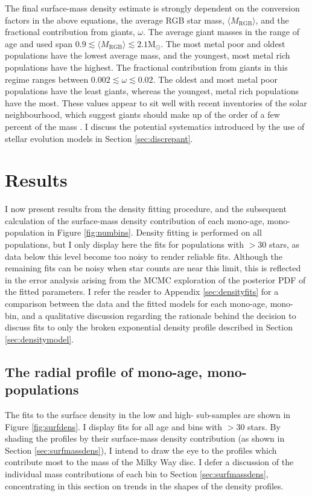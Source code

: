 The final surface-mass density estimate is strongly dependent on the conversion factors in the above equations, the average RGB star mass, $\langle M_{\mathrm{RGB}} \rangle$, and the fractional contribution from giants, $\omega$. The average giant masses in the range of age and \feh{} used span $0.9 \lesssim \langle M_{\mathrm{RGB}} \rangle \lesssim 2.1 \mathrm{M_{\odot}}$. The most metal poor and oldest populations have the lowest average mass, and the youngest, most metal rich populations have the highest. The fractional contribution from giants in this regime ranges between $0.002 \lesssim \omega \lesssim 0.02 $. The oldest and most metal poor populations have the least giants, whereas the youngest, metal rich populations have the most. These values appear to sit well with recent inventories of the solar neighbourhood, which suggest giants should make up of the order of a few percent of the mass \citep{2015ApJ...814...13M}. I discuss the potential systematics introduced by the use of stellar evolution models in Section \ref{sec:discrepant}.


\section{Results}
\label{sec:resultsa}
I now present results from the density fitting procedure, and the subsequent calculation of the surface-mass density contribution of each mono-age, mono-\feh{} population in Figure \ref{fig:numbins}. Density fitting is performed on all populations, but I only display here the fits for populations with $> 30$ stars, as data below this level become too noisy to render reliable fits. Although the remaining fits can be noisy when star counts are near this limit, this is reflected in the error analysis arising from the MCMC exploration of the posterior PDF of the fitted parameters. I refer the reader to Appendix \ref{sec:densityfits} for a comparison between the data and the fitted models for each mono-age, mono-\feh{} bin, and a qualitative discussion regarding the rationale behind the decision to discuss fits to only the broken exponential density profile described in Section \ref{sec:densitymodel}.

\subsection{The radial profile of mono-age, mono-\feh{} populations}
The fits to the surface density in the low and high-\afe{} sub-samples are shown in Figure \ref{fig:surfdens}. I display fits for all age and \feh{} bins with $> 30$ stars. By shading the profiles by their surface-mass density contribution (as shown in Section \ref{sec:surfmassdens}), I intend to draw the eye to the profiles which contribute most to the mass of the Milky Way disc. I defer a discussion of the individual mass contributions of each bin to Section \ref{sec:surfmassdens}, concentrating in this section on trends in the shapes of the density profiles. 



